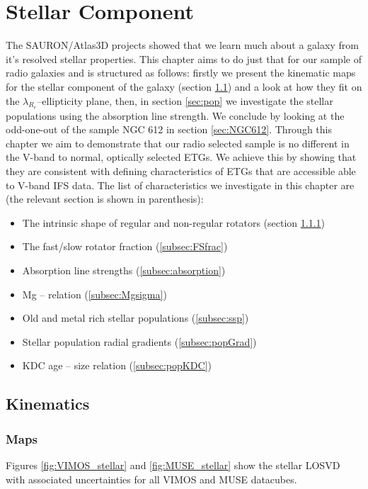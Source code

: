 \chapter{Stellar Component}
	\label{cha:stellar}
The SAURON/Atlas3D projects showed that we learn much about a galaxy from it's resolved stellar properties. This chapter aims to do just that for our sample of radio galaxies and is structured as follows: firstly we present the kinematic maps for the stellar component of the galaxy (section \ref{sec:stellarKin}) and a look at how they fit on the $\lambda_{R_e}$--ellipticity plane, then, in section \ref{sec:pop} we investigate the stellar populations using the absorption line strength. We conclude by looking at the odd-one-out of the sample NGC 612 in section \ref{sec:NGC612}. Through this chapter we aim to demonstrate that our radio selected sample is no different in the V-band to normal, optically selected ETGs. We achieve this by showing that they are consistent with defining characteristics of ETGs that are accessible able to V-band IFS data. The list of characteristics we investigate in this chapter are (the relevant section is shown in parenthesis):
\begin{itemize}
	\item The intrinsic shape of regular and non-regular rotators (section \ref{subsec:maps})
	\item The fast/slow rotator fraction (\ref{subsec:FSfrac})
	\item Absorption line strengths (\ref{subsec:absorption})
	\item Mg -- \textsigma relation (\ref{subsec:Mgsigma})
	\item Old and metal rich stellar populations (\ref{subsec:ssp})
	\item Stellar population radial gradients (\ref{subsec:popGrad})
	\item KDC age -- size relation (\ref{subsec:popKDC})
\end{itemize}

\section{Kinematics}
	\label{sec:stellarKin}

	\subsection{Maps}
		\label{subsec:maps}
		Figures \ref{fig:VIMOS_stellar} and \ref{fig:MUSE_stellar} show the stellar LOSVD with associated uncertainties for all VIMOS and MUSE datacubes.


